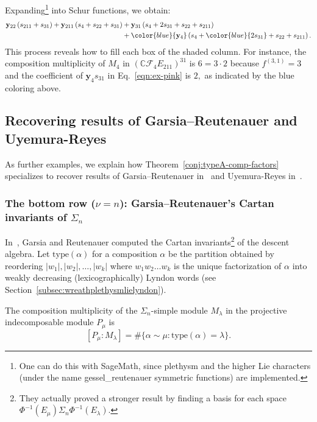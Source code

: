 \documentclass[ALCO, Unicode]{cedram}
\def\C{{\mathbb{C}}}
\begin{document}
{Expanding}\footnote{One can do this with SageMath, since plethysm and the higher Lie characters (under the name gessel\_reutenauer symmetric functions) are implemented. } into Schur {functions}, we obtain:
\begin{align}\label{eqn:ex-pink}
\begin{split}
\mathbf{y}_{22} \left(s_{211} + s_{31}\right) + \mathbf{y}_{211} \left(s_4 + s_{22} + s_{31}\right) &+ {\mathbf{y}_{31}}\normalcolor \left(s_4 + {2s_{31}}\normalcolor + s_{22} + s_{211}\right)\\ &+ \color{blue}{\mathbf{y}_{4}}\normalcolor\left(s_4 + \color{blue}{2s_{31}}\normalcolor + s_{22} + s_{211}\right).
\end{split}
    \end{align}
This process reveals how to fill each box of the shaded column. For instance, the composition multiplicity of $M_{4}$ in $\left(\C\mathcal{F}_4E_{211}\right)^{31}$ is $6 = 3 \cdot 2$ because $f^{(3,1)} = 3$ and the coefficient of $\mathbf{y}_{4}s_{31}$ in Eq.~\eqref{eqn:ex-pink} is $2,$ as indicated by the blue coloring above.

\subsection{Recovering results of Garsia--Reutenauer and Uyemura-Reyes}\label{sec:recovering-results}

As further examples, we explain how Theorem~\ref{conj:typeA-comp-factors} specializes to recover results of Garsia--Reutenauer in~\cite{garsia-reutenauer} and Uyemura-Reyes in~\cite{Uyemura-Reyes}.

\subsubsection{The bottom row ($\nu = n$): Garsia--Reutenauer's Cartan invariants of $\Sigma_n$}
In~\cite[Theorem 5.4]{garsia-reutenauer}, Garsia and Reutenauer computed the Cartan invariants\footnote{They actually proved a stronger result by finding a basis for each space $\Phi^{-1}(E_\mu)\Sigma_n \Phi^{-1}(E_\lambda).$} of the descent algebra. Let \textbf{$\mathrm{type}(\alpha)$} for a composition $\alpha$ be the partition obtained by reordering $|w_1|, |w_2|, \ldots, |w_k|$ where $w_1 w_2\ldots w_k$ is the unique factorization of $\alpha$ into weakly decreasing (lexicographically) Lyndon words (see Section~\ref{subsec:wreathplethysmlielyndon}). 

\begin{thm}\label{thm:garsia-reutenauer} The composition multiplicity of the $\Sigma_n$-simple module $M_\lambda$ in the projective indecomposable module $P_\mu$ is
\[[P_\mu: M_\lambda ] = \# \{\alpha \sim \mu : \mathrm{type}(\alpha) = \lambda\}.\]
\end{thm}
\end{document}
